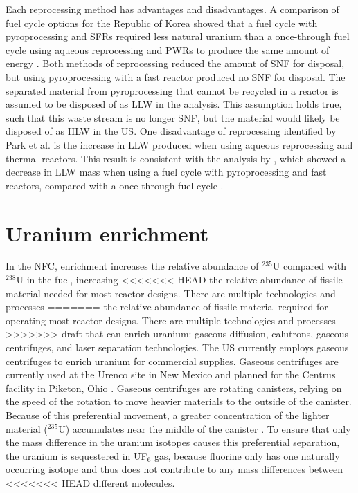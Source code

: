 Each reprocessing method has advantages and disadvantages. 
A comparison of fuel cycle options for the Republic of Korea 
showed that a fuel cycle with pyroprocessing and \glspl{SFR} required less natural 
uranium than a once-through fuel cycle using aqueous reprocessing 
and \glspl{PWR} to produce the same amount of energy 
\cite{park_comparative_2011}. Both methods of reprocessing  
reduced the amount of \gls{SNF} for disposal,
but using pyroprocessing with a fast reactor produced no \gls{SNF} for 
disposal. The separated material from 
pyroprocessing that cannot be recycled in a reactor is assumed to be 
disposed of as \gls{LLW} in the analysis. This assumption 
holds true, such that this waste stream is no longer 
\gls{SNF}, but the material would likely be disposed of 
as \gls{HLW} in the US.
One disadvantage of reprocessing 
identified by Park et al. \cite{park_comparative_2011} is the 
increase in \gls{LLW} produced 
when using aqueous reprocessing and 
thermal reactors. This result is consistent with the analysis 
by \cite{widder_benefits_2010}, which showed a decrease in \gls{LLW} 
mass when using a fuel cycle with pyroprocessing and fast reactors, 
compared with a once-through fuel cycle \cite{park_comparative_2011}. 

\section{Uranium enrichment}
In the \gls{NFC}, enrichment increases the relative abundance of 
$^{235}$U compared with $^{238}$U in the fuel, increasing
<<<<<<< HEAD
the relative abundance of fissile material needed 
for most reactor designs. There are multiple technologies and processes 
=======
the relative abundance of fissile material required
for operating most reactor designs. There are multiple technologies and processes 
>>>>>>> draft
that can enrich uranium: gaseous diffusion, calutrons, gaseous centrifuges, 
and laser separation technologies. The US currently employs gaseous 
centrifuges to enrich uranium for commercial supplies. Gaseous centrifuges 
are currently used at the Urenco site in New Mexico 
\cite{us_nuclear_regulatory_commission_louisiana_2022} and planned for the 
Centrus facility in Piketon, Ohio 
\cite{us_nuclear_regulatory_commission_centrus_2021}. Gaseous centrifuges 
are rotating canisters, 
relying on the speed of the rotation to move heavier 
materials to the outside of the canister. Because of this preferential 
movement, a greater concentration of the lighter material ($^{235}$U) 
accumulates near the middle of the canister \cite{villani_uranium_1979}. 
To ensure that only the mass difference in the uranium isotopes causes 
this preferential separation, the uranium is sequestered in UF$_6$ gas, because 
fluorine only has one naturally occurring isotope and thus 
does not contribute to any mass differences between 
<<<<<<< HEAD
different molecules. 

